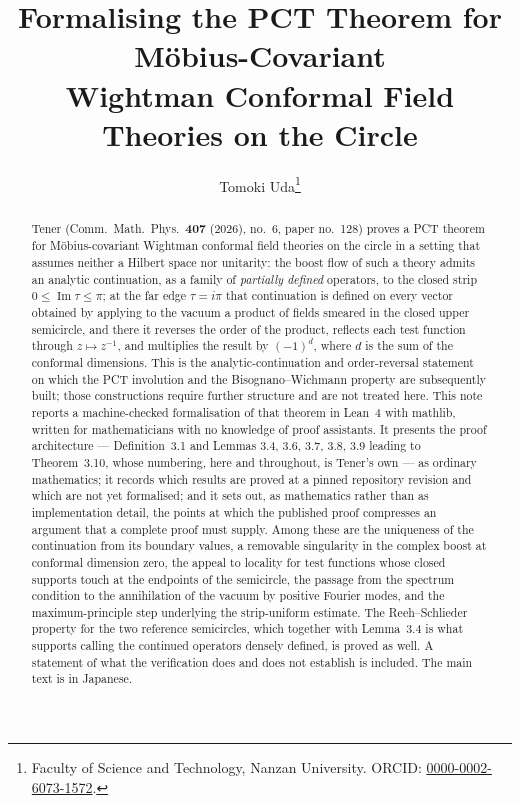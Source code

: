 \documentclass[11pt,a4paper]{article}
\title{\bfseries\Large Formalising the PCT Theorem for M\"obius-Covariant\\ Wightman Conformal Field Theories on the Circle}
\author{Tomoki Uda\thanks{Faculty of Science and Technology, Nanzan University.
  ORCID: \href{https://orcid.org/0000-0002-6073-1572}{0000-0002-6073-1572}.}}
\date{\notedate}
\theoremstyle{definition}
\begin{document}
\maketitle

\begin{abstract}
\noindent
Tener (Comm.\ Math.\ Phys.\ \textbf{407} (2026), no.~6, paper no.~128) proves a PCT theorem for
M\"obius-covariant Wightman conformal field theories on the circle in a setting that assumes
neither a Hilbert space nor unitarity: the boost flow of such a theory admits an analytic
continuation, as a family of \emph{partially defined} operators, to the closed strip
$0 \le \operatorname{Im}\tau \le \pi$; at the far edge $\tau = i\pi$ that continuation is
defined on every vector obtained by applying to the vacuum a product of fields smeared in the
closed upper semicircle, and there it reverses the order of the product, reflects each test function through $z \mapsto z^{-1}$, and multiplies the
result by $(-1)^{d}$, where $d$ is the sum of the conformal dimensions. This is the
analytic-continuation and order-reversal statement on which the PCT involution and the
Bisognano--Wichmann property are subsequently built; those constructions require further
structure and are not treated here. This note reports a
machine-checked formalisation of that theorem in Lean~4 with mathlib, written for mathematicians
with no knowledge of proof assistants. It presents the proof architecture --- Definition~3.1 and
Lemmas 3.4, 3.6, 3.7, 3.8, 3.9 leading to Theorem~3.10, whose numbering, here and throughout,
is Tener's own --- as ordinary mathematics; it records
which results are proved at a pinned repository revision and which are not yet formalised; and it sets out,
as mathematics rather than as implementation detail, the points at which the published proof
compresses an argument that a complete proof must supply. Among these are the uniqueness of the
continuation from its boundary values, a removable singularity in the complex boost at conformal
dimension zero, the appeal to locality for test functions whose closed supports touch at the
endpoints of the semicircle, the passage from the spectrum condition to the annihilation of the
vacuum by positive Fourier modes, and the maximum-principle step underlying the strip-uniform
estimate. The Reeh--Schlieder property for the two reference semicircles, which together with Lemma~3.4
is what supports calling the continued operators densely defined, is proved as well. A statement of what the verification does
and does not establish is included. The main text is in Japanese.
\end{abstract}
\end{document}
